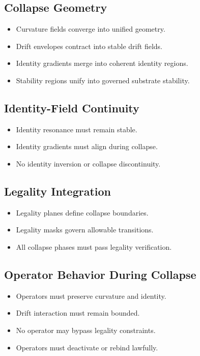 \subsection{Collapse Geometry}
\begin{itemize}
    \item Curvature fields converge into unified geometry.
    \item Drift envelopes contract into stable drift fields.
    \item Identity gradients merge into coherent identity regions.
    \item Stability regions unify into governed substrate stability.
\end{itemize}

\subsection{Identity-Field Continuity}
\begin{itemize}
    \item Identity resonance must remain stable.
    \item Identity gradients must align during collapse.
    \item No identity inversion or collapse discontinuity.
\end{itemize}

\subsection{Legality Integration}
\begin{itemize}
    \item Legality planes define collapse boundaries.
    \item Legality masks govern allowable transitions.
    \item All collapse phases must pass legality verification.
\end{itemize}

\subsection{Operator Behavior During Collapse}
\begin{itemize}
    \item Operators must preserve curvature and identity.
    \item Drift interaction must remain bounded.
    \item No operator may bypass legality constraints.
    \item Operators must deactivate or rebind lawfully.
\end{itemize}

